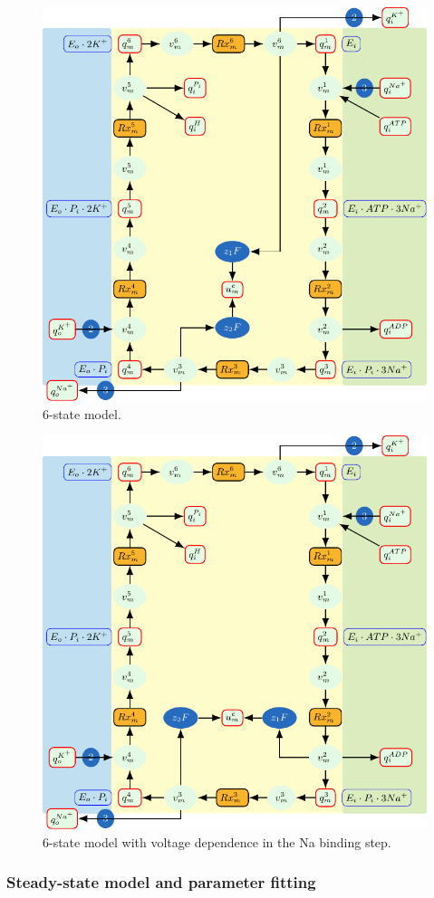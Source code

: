 \documentclass{biophys-new}
\begin{document}
\begin{figure}
\caption{6-state model.}
\centering
\includegraphics[width=0.7\linewidth]{6state_1.pdf}
\end{figure}


\begin{figure}
\caption{6-state model with voltage dependence in the Na binding step.}
\centering
\includegraphics[width=0.7\linewidth]{6state_3.pdf}
\end{figure}


\subsubsection{Steady-state model and parameter fitting}
\end{document}
